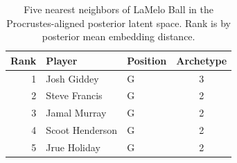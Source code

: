 \begin{table}[htbp]
  \centering\small
  \begin{tabular}{rllc}
    \toprule
    Rank & Player & Position & Archetype \\
    \midrule
    1 & Josh Giddey & G & 3 \\
    2 & Steve Francis & G & 2 \\
    3 & Jamal Murray & G & 2 \\
    4 & Scoot Henderson & G & 2 \\
    5 & Jrue Holiday & G & 2 \\
    \bottomrule
  \end{tabular}
  \caption{Five nearest neighbors of LaMelo Ball in the Procrustes-aligned posterior latent space. Rank is by posterior mean embedding distance.}
  \label{tab:LaMelo_Ball_neighbors}
\end{table}


